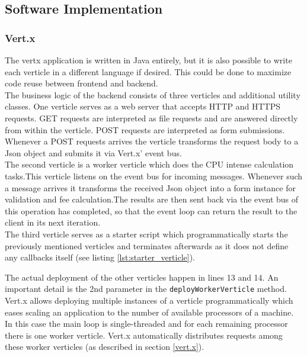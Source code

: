 \FloatBarrier
\subsection{Software Implementation}
\label{software_implementation}

\subsubsection{Vert.x}
\label{implementation_vertx}

The vertx application is written in Java entirely, but it is also possible to
write each verticle in a different language if desired. This could be done to
maximize code reuse between frontend and backend.\\
The business logic of the backend consists of three verticles and additional
utility classes.
One verticle serves as a web server that accepts HTTP and HTTPS requests. GET
requests are interpreted as file requests and are answered directly from within
the verticle. POST requests are interpreted as form submissions. Whenever a POST
requests arrives the verticle transforms the request body to a Json object and
submits it via Vert.x' event bus.\\
The second verticle is a worker verticle which does the CPU intense calculation
tasks.This verticle listens on the event bus for incoming messages. Whenever
such a message arrives it transforms the received Json object into a form
instance for validation and fee calculation.The results are then sent back via
the event bus of this operation has completed, so that the event loop can return
the result to the client in its next iteration.\\
The third verticle serves as a starter script which programmatically starts
the previously mentioned verticles and terminates afterwards as it does not
define any callbacks itself (see listing \ref{lst:starter_verticle}).



The actual deployment of the other verticles happen in lines 13 and 14.
An important detail is the 2nd parameter in the \texttt{deployWorkerVerticle} method.
Vert.x allows deploying multiple instances of a verticle programmatically
which eases scaling an application to the number of available processors of a machine.
In this case the main loop is single-threaded and for each remaining processor
there is one worker verticle. Vert.x automatically distributes requests among
these worker verticles (as described in section \ref{vert.x}).

